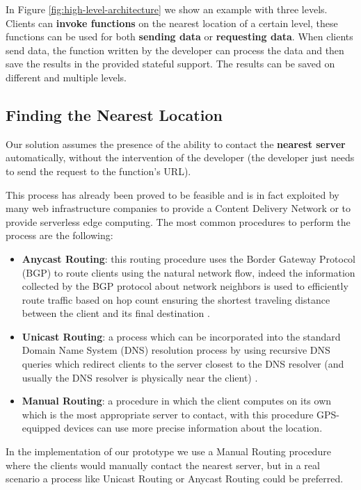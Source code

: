 In Figure \ref{fig:high-level-architecture} we show an example with three levels. Clients can \textbf{invoke functions} on the nearest location of a certain level, these functions can be used for both \textbf{sending data} or \textbf{requesting data}. When clients send data, the function written by the developer can process the data and then save the results in the provided stateful support. The results can be saved on different and multiple levels.


\subsection{Finding the Nearest Location}
Our solution assumes the presence of the ability to contact the \textbf{nearest server} automatically, without the intervention of the developer (the developer just needs to send the request to the function's URL).

This process has already been proved to be feasible and is in fact exploited by many web infrastructure companies to provide a Content Delivery Network or to provide serverless edge computing. The most common procedures to perform the process are the following:
\begin{itemize}
    \item \textbf{Anycast Routing}: this routing procedure uses the Border Gateway Protocol (BGP) to route clients using the natural network flow, indeed the information collected by the BGP protocol about network neighbors is used to efficiently route traffic based on hop count ensuring the shortest traveling distance between the client and its final destination \cite{anycast-cloudflare}.
    \item \textbf{Unicast Routing}: a process which can be incorporated into the standard Domain Name System (DNS) resolution process by using recursive DNS queries which redirect clients to the server closest to the DNS resolver (and usually the DNS resolver is physically near the client) \cite{unicast-vs-anycast}.
    \item \textbf{Manual Routing}: a procedure in which the client computes on its own which is the most appropriate server to contact, with this procedure GPS-equipped devices can use more precise information about the location.
\end{itemize}

In the implementation of our prototype we use a Manual Routing procedure where the clients would manually contact the nearest server, but in a real scenario a process like Unicast Routing or Anycast Routing could be preferred.



